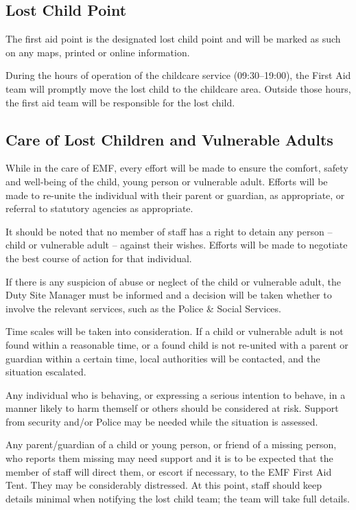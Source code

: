 \subsection{Lost Child Point}
The first aid point is the designated lost child point and will be marked as
such on any maps, printed or online information.

During the hours of operation of the childcare service (09:30--19:00), the First
Aid team will promptly move the lost child to the childcare area. Outside those
hours, the first aid team will be responsible for the lost child.

\subsection{Care of Lost Children and Vulnerable Adults}

While in the care of EMF, every effort will be made to
ensure the comfort, safety and well-being of the child, young person or
vulnerable adult. Efforts will be made to re-unite the
individual with their parent or guardian, as appropriate, or referral to
statutory agencies as appropriate.

It should be noted that no member of staff has a right to detain any
person -- child or vulnerable adult -- against their wishes. Efforts will 
be made to negotiate the best course of action for that individual.

If there is any suspicion of abuse or neglect of the child or vulnerable adult,
the Duty Site Manager must be informed and a decision will be taken whether to
involve the relevant services, such as the Police \& Social Services.

Time scales will be taken into consideration. If a child or vulnerable adult is
not found within a reasonable time, or a found child is not re-united with a
parent or guardian within a certain time, local authorities will be contacted,
and the situation escalated.

Any individual who is behaving, or expressing a serious intention to behave, in
a manner likely to harm themself or others should be considered at risk.
Support from security and/or Police may be needed while the situation is
assessed.

Any parent/guardian of a child or young person, or friend of a missing person,
who reports them missing may need support and it is to be expected that the
member of staff will direct them, or escort if necessary, to the EMF First
Aid Tent. They may be considerably distressed. At this point, staff should keep
details minimal when notifying the lost child team; the team will take full
details.

